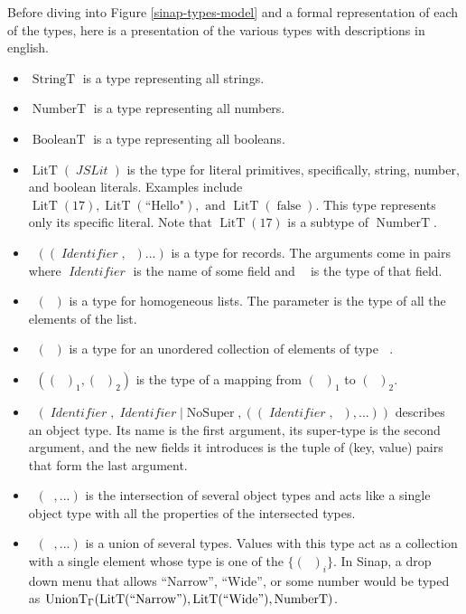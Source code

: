 \documentclass[12pt]{article}
\DeclareMathOperator{\StringT}{StringT}
\DeclareMathOperator{\NumberT}{NumberT}
\DeclareMathOperator{\BooleanT}{BooleanT}
\DeclareMathOperator{\LitT}{LitT}
\DeclareMathOperator{\JSLit}{\textit{JSLit}}
\DeclareMathOperator{\RecT}{RecT_\Gamma}
\DeclareMathOperator{\ObjT}{ObjT_\Gamma}
\DeclareMathOperator{\ListT}{ListT_\Gamma}
\DeclareMathOperator{\SetT}{SetT_\Gamma}
\DeclareMathOperator{\MapT}{MapT_\Gamma}
\DeclareMathOperator{\UnionT}{UnionT_\Gamma}
\DeclareMathOperator{\InterT}{InterT_\Gamma}
\DeclareMathOperator{\Identifier}{\textit{Identifier}}
\DeclareMathOperator{\Type}{{\textit{Type}_\Gamma}}
\DeclareMathOperator{\NoSuper}{NoSuper}
\begin{document}
Before diving into Figure \ref{sinap-types-model} and 
a formal representation of each of the types, here is a presentation 
of the various types with descriptions in english. 
\begin{itemize}
    \item \(\StringT\) is a type representing all strings.
    \item \(\NumberT\) is a type representing all numbers.
    \item \(\BooleanT\) is a type representing all booleans.
    \item \(\LitT(\JSLit)\) is the type for literal primitives, specifically,
    string, number, and boolean literals. 
    Examples include \(\LitT(17), \LitT(\text{``Hello"}), \text{ and } 
    \LitT(\operatorname{false})\). This type represents only its specific literal. 
    Note that \(\LitT(17)\) is a subtype of \(\NumberT\).
    \item \(\RecT((\Identifier, \Type)...)\) is a type for records. 
    The arguments come in pairs where
    \(\Identifier\) is the name of some field and \(\Type\) is the
    type of that field.
    \item \(\ListT(\Type)\) is a type for homogeneous lists. The
    parameter is the type of all the elements of the list. 
    \item \(\SetT(\Type)\) is a type for an unordered collection
    of elements of type \(\Type\).
    \item \(\MapT((\Type)_1, (\Type)_2)\) is the type of a mapping from 
    \((\Type)_1\) to \((\Type)_2\).
    \item \(\ObjT(\Identifier, \Identifier | \NoSuper, ((\Identifier, \Type), ...))\)
    describes an object type. Its name is the first argument, 
    its super-type is the second argument, and the new fields 
    it introduces is the tuple of (key, value) pairs that form the
    last argument. 
    \item \(\InterT(\ObjT,  ...)\) is the intersection of several 
    object types and acts like a single object type with all the 
    properties of the intersected types. 
    \item \(\UnionT(\Type, ...)\) is a union of several types. 
    Values with this type act as a collection with a single element
    whose type is one of the \(\{(\Type)_i\}\). In Sinap, a drop down 
    menu that allows ``Narrow'', ``Wide'', or some number would be 
    typed as \(\UnionT(\LitT(``\text{Narrow}"), \LitT(``\text{Wide}"),
     \NumberT)\).
\end{itemize}
\end{document}

